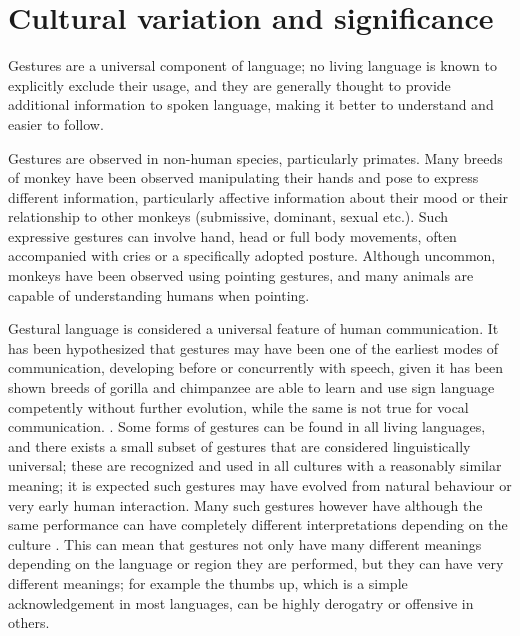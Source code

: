 \begin{todoenv}

\end{todoenv}

\section{Cultural variation and significance}
\label{sec:culture-variation}


Gestures are a universal component of language; no living language is known to explicitly exclude their usage, and they are generally thought to provide additional information to spoken language, making it better to understand and easier to follow.

Gestures are observed in non-human species, particularly primates. Many breeds of monkey have been observed manipulating their hands and pose to express different information, particularly affective information about their mood or their relationship to other monkeys (submissive, dominant, sexual etc.). Such expressive gestures can involve hand, head or full body movements, often accompanied with cries or a specifically adopted posture. Although uncommon, monkeys have been observed using pointing gestures, and many animals are capable of understanding humans when pointing. \cite{Goodall1968} \cite{Argyle1988}

Gestural language is considered a universal feature of human communication. It has been hypothesized that gestures may have been one of the earliest modes of communication, developing before or concurrently with speech, given it has been shown breeds of gorilla and chimpanzee are able to learn and use sign language competently without further evolution, while the same is not true for vocal communication. \cite{Hewes1976}. Some forms of gestures can be found in all living languages, and there exists a small subset of gestures that are considered linguistically universal; these are recognized and used in all cultures with a reasonably similar meaning; it is expected such gestures may have evolved from natural behaviour or very early human interaction. Many such gestures however have although the same performance can have completely different interpretations depending on the culture \cite{KnappHall2010}. This can mean that gestures not only have many different meanings depending on the language or region they are performed, but they can have very different meanings; for example the thumbs up, which is a simple acknowledgement in most languages, can be highly derogatry or offensive in others.

